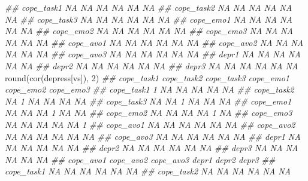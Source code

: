\documentclass[
  chinese-hans,
  letterpaper,
  DIV=11,
  numbers=noendperiod]{scrartcl}
\newenvironment{Shaded}{\begin{snugshade}}{\end{snugshade}}
\newcommand{\DecValTok}[1]{\textcolor[rgb]{0.68,0.00,0.00}{#1}}
\newcommand{\DocumentationTok}[1]{\textcolor[rgb]{0.37,0.37,0.37}{\textit{#1}}}
\newcommand{\FunctionTok}[1]{\textcolor[rgb]{0.28,0.35,0.67}{#1}}
\newcommand{\NormalTok}[1]{\textcolor[rgb]{0.00,0.23,0.31}{#1}}
\begin{document}
\begin{Shaded}
\begin{Highlighting}[numbers=left,,]
\DocumentationTok{\#\# cope\_task1        NA        NA        NA    NA    NA    NA}
\DocumentationTok{\#\# cope\_task2        NA        NA        NA    NA    NA    NA}
\DocumentationTok{\#\# cope\_task3        NA        NA        NA    NA    NA    NA}
\DocumentationTok{\#\# cope\_emo1         NA        NA        NA    NA    NA    NA}
\DocumentationTok{\#\# cope\_emo2         NA        NA        NA    NA    NA    NA}
\DocumentationTok{\#\# cope\_emo3         NA        NA        NA    NA    NA    NA}
\DocumentationTok{\#\# cope\_avo1         NA        NA        NA    NA    NA    NA}
\DocumentationTok{\#\# cope\_avo2         NA        NA        NA    NA    NA    NA}
\DocumentationTok{\#\# cope\_avo3         NA        NA        NA    NA    NA    NA}
\DocumentationTok{\#\# depr1             NA        NA        NA    NA    NA    NA}
\DocumentationTok{\#\# depr2             NA        NA        NA    NA    NA    NA}
\DocumentationTok{\#\# depr3             NA        NA        NA    NA    NA    NA}
\FunctionTok{round}\NormalTok{(}\FunctionTok{cor}\NormalTok{(depress[vs]), }\DecValTok{2}\NormalTok{)}
\DocumentationTok{\#\#            cope\_task1 cope\_task2 cope\_task3 cope\_emo1 cope\_emo2 cope\_emo3}
\DocumentationTok{\#\# cope\_task1          1         NA         NA        NA        NA        NA}
\DocumentationTok{\#\# cope\_task2         NA          1         NA        NA        NA        NA}
\DocumentationTok{\#\# cope\_task3         NA         NA          1        NA        NA        NA}
\DocumentationTok{\#\# cope\_emo1          NA         NA         NA         1        NA        NA}
\DocumentationTok{\#\# cope\_emo2          NA         NA         NA        NA         1        NA}
\DocumentationTok{\#\# cope\_emo3          NA         NA         NA        NA        NA         1}
\DocumentationTok{\#\# cope\_avo1          NA         NA         NA        NA        NA        NA}
\DocumentationTok{\#\# cope\_avo2          NA         NA         NA        NA        NA        NA}
\DocumentationTok{\#\# cope\_avo3          NA         NA         NA        NA        NA        NA}
\DocumentationTok{\#\# depr1              NA         NA         NA        NA        NA        NA}
\DocumentationTok{\#\# depr2              NA         NA         NA        NA        NA        NA}
\DocumentationTok{\#\# depr3              NA         NA         NA        NA        NA        NA}
\DocumentationTok{\#\#            cope\_avo1 cope\_avo2 cope\_avo3 depr1 depr2 depr3}
\DocumentationTok{\#\# cope\_task1        NA        NA        NA    NA    NA    NA}
\DocumentationTok{\#\# cope\_task2        NA        NA        NA    NA    NA    NA}

\end{Highlighting}
\end{Shaded}
\end{document}
